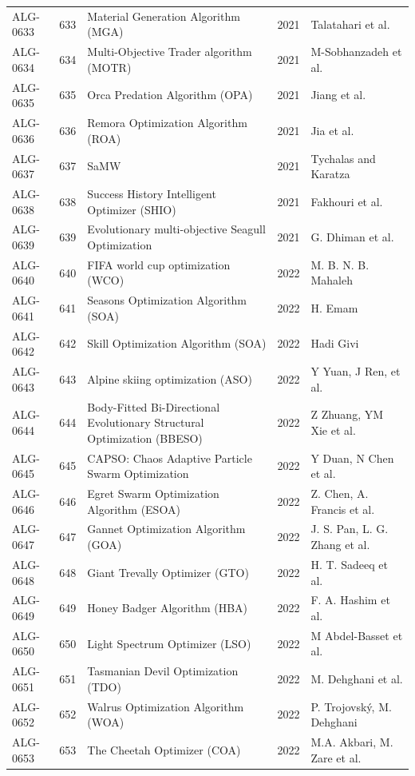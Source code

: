 \documentclass[8pt]{article}
\begin{document}
\begin{landscape}
\begin{longtable}{P{1.7cm}rP{10.0cm}rP{7.2cm}}
ALG-0633 & 633 & Material Generation Algorithm (MGA) & 2021 & Talatahari et al. \\
ALG-0634 & 634 & Multi-Objective Trader algorithm (MOTR) & 2021 & M-Sobhanzadeh et al. \\
ALG-0635 & 635 & Orca Predation Algorithm (OPA) & 2021 & Jiang et al. \\
ALG-0636 & 636 & Remora Optimization Algorithm (ROA) & 2021 & Jia et al. \\
ALG-0637 & 637 & SaMW & 2021 & Tychalas and Karatza \\
ALG-0638 & 638 & Success History Intelligent Optimizer (SHIO) & 2021 & Fakhouri et al. \\
ALG-0639 & 639 & Evolutionary multi-objective Seagull Optimization & 2021 & G. Dhiman et al. \\
ALG-0640 & 640 & FIFA world cup optimization (WCO) & 2022 & M. B. N. B. Mahaleh \\
ALG-0641 & 641 & Seasons Optimization Algorithm (SOA) & 2022 & H. Emam \\
ALG-0642 & 642 & Skill Optimization Algorithm (SOA) & 2022 & Hadi Givi \\
ALG-0643 & 643 & Alpine skiing optimization (ASO) & 2022 & Y Yuan, J Ren, et al. \\
ALG-0644 & 644 & Body-Fitted Bi-Directional Evolutionary Structural Optimization (BBESO) & 2022 & Z Zhuang, YM Xie et al. \\
ALG-0645 & 645 & CAPSO: Chaos Adaptive Particle Swarm Optimization & 2022 & Y Duan, N Chen et al. \\
ALG-0646 & 646 & Egret Swarm Optimization Algorithm (ESOA) & 2022 & Z. Chen, A. Francis  et al. \\
ALG-0647 & 647 & Gannet Optimization Algorithm (GOA) & 2022 & J. S. Pan, L. G. Zhang et al. \\
ALG-0648 & 648 & Giant Trevally Optimizer (GTO) & 2022 & H. T. Sadeeq et al. \\
ALG-0649 & 649 & Honey Badger Algorithm (HBA) & 2022 & F. A. Hashim  et al. \\
ALG-0650 & 650 & Light Spectrum Optimizer (LSO) & 2022 & M Abdel-Basset et al. \\
ALG-0651 & 651 & Tasmanian Devil Optimization (TDO) & 2022 & M. Dehghani et al. \\
ALG-0652 & 652 & Walrus Optimization Algorithm (WOA) & 2022 & P. Trojovský, M. Dehghani \\
ALG-0653 & 653 & The Cheetah Optimizer (COA) & 2022 & M.A. Akbari, M. Zare  et al. \\

\end{longtable}
\end{landscape}
\end{document}
